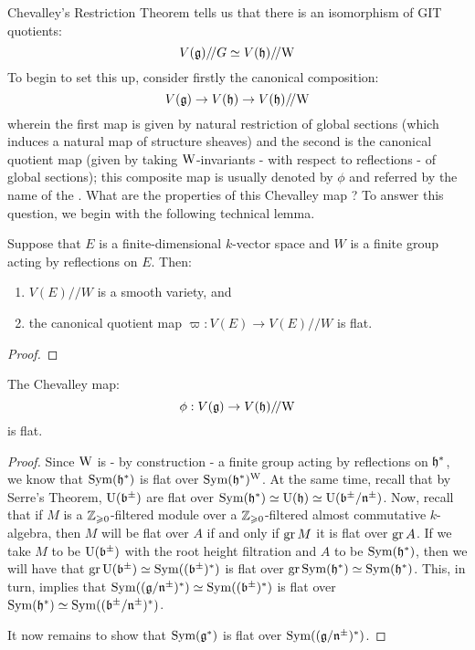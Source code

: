         Chevalley's Restriction Theorem tells us that there is an isomorphism of GIT quotients:
            $$V(\mathfrak{g})/\!/G \simeq V(\mathfrak{h})/\!/\mathrm{W}$$
        To begin to set this up, consider firstly the canonical composition:
            $$V(\mathfrak{g}) \to V(\mathfrak{h}) \to V(\mathfrak{h})/\!/\mathrm{W}$$
        wherein the first map is given by natural restriction of global sections (which induces a natural map of structure sheaves) and the second is the canonical quotient map (given by taking $\mathrm{W}$-invariants - with respect to reflections - of global sections); this composite map is usually denoted by $\phi$ and referred by the name of the . What are the properties of this Chevalley map ? To answer this question, we begin with the following technical lemma.
        \begin{lemma}
            Suppose that $E$ is a finite-dimensional $k$-vector space and $W$ is a finite group acting by reflections on $E$. Then:
            \begin{enumerate}
                \item $V(E)/\!/W$ is a smooth variety, and
                \item the canonical quotient map $\varpi: V(E) \to V(E)/\!/W$ is flat. 
            \end{enumerate}
        \end{lemma}
            \begin{proof}
                
            \end{proof}
        \begin{corollary}
            The Chevalley map:
                $$\phi: V(\mathfrak{g}) \to V(\mathfrak{h})/\!/\mathrm{W}$$
            is flat.
        \end{corollary}
            \begin{proof}
                Since $\mathrm{W}$ is - by construction - a finite group acting by reflections on $\mathfrak{h}^*$, we know that $\mathrm{Sym}(\mathfrak{h}^*)$ is flat over $\mathrm{Sym}(\mathfrak{h}^*)^{\mathrm{W}}$. At the same time, recall that by Serre's Theorem, $\mathrm{U}(\mathfrak{b}^{\pm})$ are flat over $\mathrm{Sym}(\mathfrak{h}^*) \simeq \mathrm{U}(\mathfrak{h}) \simeq \mathrm{U}(\mathfrak{b}^{\pm}/\mathfrak{n}^{\pm})$. Now, recall that if $M$ is a $\mathbb{Z}_{\geqslant 0}$-filtered module over a $\mathbb{Z}_{\geqslant 0}$-filtered almost commutative $k$-algebra, then $M$ will be flat over $A$ if and only if $\operatorname{gr} M$ it is flat over $\operatorname{gr} A$. If we take $M$ to be $\mathrm{U}(\mathfrak{b}^{\pm})$ with the root height filtration and $A$ to be $\mathrm{Sym}(\mathfrak{h}^*)$, then we will have that $\operatorname{gr} \mathrm{U}(\mathfrak{b}^{\pm}) \simeq \mathrm{Sym}((\mathfrak{b}^{\pm})^*)$ is flat over $\operatorname{gr} \mathrm{Sym}(\mathfrak{h}^*) \simeq \mathrm{Sym}(\mathfrak{h}^*)$. This, in turn, implies that $\mathrm{Sym}((\mathfrak{g}/\mathfrak{n}^{\pm})^*) \simeq \mathrm{Sym}((\mathfrak{b}^{\pm})^*)$ is flat over $\mathrm{Sym}(\mathfrak{h}^*) \simeq \mathrm{Sym}((\mathfrak{b}^{\pm}/\mathfrak{n}^{\pm})^*)$. 

                It now remains to show that $\mathrm{Sym}(\mathfrak{g}^*)$ is flat over $\mathrm{Sym}((\mathfrak{g}/\mathfrak{n}^{\pm})^*)$. 
            \end{proof}

